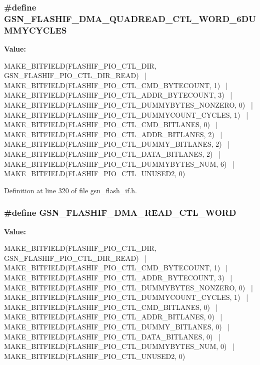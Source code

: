 \hypertarget{a00501_a6b34a4b3658f6bb4275412db19e2f597}{
\subsubsection[{GSN\_\-FLASHIF\_\-DMA\_\-QUADREAD\_\-CTL\_\-WORD\_\-6DUMMYCYCLES}]{\setlength{\rightskip}{0pt plus 5cm}\#define GSN\_\-FLASHIF\_\-DMA\_\-QUADREAD\_\-CTL\_\-WORD\_\-6DUMMYCYCLES}}
\label{a00501_a6b34a4b3658f6bb4275412db19e2f597}
{\bfseries Value:}
\begin{DoxyCode}
MAKE_BITFIELD(FLASHIF_PIO_CTL_DIR, GSN_FLASHIF_PIO_CTL_DIR_READ) \
        | MAKE_BITFIELD(FLASHIF_PIO_CTL_CMD_BYTECOUNT, 1) \
        | MAKE_BITFIELD(FLASHIF_PIO_CTL_ADDR_BYTECOUNT, 3) \
        | MAKE_BITFIELD(FLASHIF_PIO_CTL_DUMMYBYTES_NONZERO, 0) \
        | MAKE_BITFIELD(FLASHIF_PIO_CTL_DUMMYCOUNT_CYCLES, 1) \
        | MAKE_BITFIELD(FLASHIF_PIO_CTL_CMD_BITLANES, 0) \
        | MAKE_BITFIELD(FLASHIF_PIO_CTL_ADDR_BITLANES, 2) \
        | MAKE_BITFIELD(FLASHIF_PIO_CTL_DUMMY_BITLANES, 2) \
        | MAKE_BITFIELD(FLASHIF_PIO_CTL_DATA_BITLANES, 2) \
        | MAKE_BITFIELD(FLASHIF_PIO_CTL_DUMMYBYTES_NUM, 6) \
        | MAKE_BITFIELD(FLASHIF_PIO_CTL_UNUSED2, 0)
\end{DoxyCode}


Definition at line 320 of file gsn\_\-flash\_\-if.h.

\hypertarget{a00501_a329a28a5b24cbcebf1677492a510b8a9}{
\subsubsection[{GSN\_\-FLASHIF\_\-DMA\_\-READ\_\-CTL\_\-WORD}]{\setlength{\rightskip}{0pt plus 5cm}\#define GSN\_\-FLASHIF\_\-DMA\_\-READ\_\-CTL\_\-WORD}}
\label{a00501_a329a28a5b24cbcebf1677492a510b8a9}
{\bfseries Value:}
\begin{DoxyCode}
MAKE_BITFIELD(FLASHIF_PIO_CTL_DIR, GSN_FLASHIF_PIO_CTL_DIR_READ) \
    | MAKE_BITFIELD(FLASHIF_PIO_CTL_CMD_BYTECOUNT, 1) \
    | MAKE_BITFIELD(FLASHIF_PIO_CTL_ADDR_BYTECOUNT, 3) \
    | MAKE_BITFIELD(FLASHIF_PIO_CTL_DUMMYBYTES_NONZERO, 0) \
    | MAKE_BITFIELD(FLASHIF_PIO_CTL_DUMMYCOUNT_CYCLES, 1) \
    | MAKE_BITFIELD(FLASHIF_PIO_CTL_CMD_BITLANES, 0) \
    | MAKE_BITFIELD(FLASHIF_PIO_CTL_ADDR_BITLANES, 0) \
    | MAKE_BITFIELD(FLASHIF_PIO_CTL_DUMMY_BITLANES, 0) \
    | MAKE_BITFIELD(FLASHIF_PIO_CTL_DATA_BITLANES, 0) \
    | MAKE_BITFIELD(FLASHIF_PIO_CTL_DUMMYBYTES_NUM, 0) \
    | MAKE_BITFIELD(FLASHIF_PIO_CTL_UNUSED2, 0)
\end{DoxyCode}


